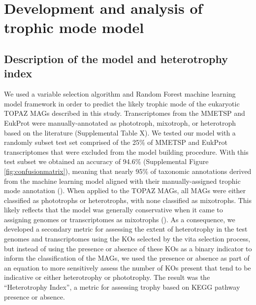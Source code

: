 \documentclass[12pt]{article}
\numberwithin{equation}{section}
\begin{document}


\section{Development and analysis of trophic mode model}

\subsection{Description of the model and heterotrophy index}
We used a variable selection algorithm and Random Forest machine learning model framework in order to predict the likely trophic mode of the eukaryotic TOPAZ MAGs described in this study. Transcriptomes from the MMETSP and EukProt were manually-annotated as phototroph, mixotroph, or heterotroph based on the literature (Supplemental Table X). We tested our model with a randomly subset test set comprised of the 25\% of MMETSP and EukProt transcriptomes \citep{Keeling2014,Richter2020EukProt} that were excluded from the model building procedure. With this test subset we obtained an accuracy of 94.6\% (Supplemental Figure \ref{fig:confusionmatrix}), meaning that nearly 95\% of taxonomic annotations derived from the machine learning model aligned with their manually-assigned trophic mode annotation ().  When applied to the TOPAZ MAGs, all MAGs were either classified as phototrophs or heterotrophs, with none classified as  mixotrophs. This likely reflects that the model was generally conservative when it came to assigning genomes or transcriptomes as mixotrophs (). As a consequence, we developed a secondary metric for assessing the extent of heterotrophy in the test genomes and transcriptomes using the KOs selected by the vita selection process, but instead of using the presence or absence of these KOs as a binary indicator to inform the classification of the MAGs, we used the presence or absence as part of an equation to more sensitively assess the number of KOs present that tend to be indicative or either heterotrophy or phototrophy. The result was the ``Heterotrophy Index'', a metric for assessing trophy based on KEGG pathway presence or absence. 
\end{document}
